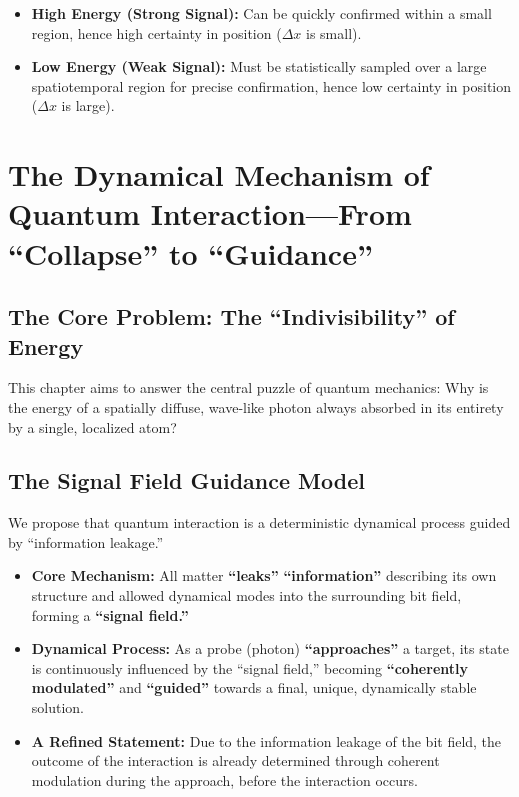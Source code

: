 \documentclass[11pt, a4paper]{article}
\begin{document}
\begin{itemize}
    \item \textbf{High Energy (Strong Signal):} Can be quickly confirmed within a small region, hence high certainty in position ($\Delta x$ is small).
    \item \textbf{Low Energy (Weak Signal):} Must be statistically sampled over a large spatiotemporal region for precise confirmation, hence low certainty in position ($\Delta x$ is large).
\end{itemize}

\section{The Dynamical Mechanism of Quantum Interaction---From ``Collapse'' to ``Guidance''}

\subsection{The Core Problem: The ``Indivisibility'' of Energy}

This chapter aims to answer the central puzzle of quantum mechanics: Why is the energy of a spatially diffuse, wave-like photon always absorbed in its entirety by a single, localized atom?

\subsection{The Signal Field Guidance Model}

We propose that quantum interaction is a deterministic dynamical process guided by ``information leakage.''

\begin{itemize}
    \item \textbf{Core Mechanism:} All matter \textbf{``leaks''} \textbf{``information''} describing its own structure and allowed dynamical modes into the surrounding bit field, forming a \textbf{``signal field.''}
    \item \textbf{Dynamical Process:} As a probe (photon) \textbf{``approaches''} a target, its state is continuously influenced by the ``signal field,'' becoming \textbf{``coherently modulated''} and \textbf{``guided''} towards a final, unique, dynamically stable solution.
    \item \textbf{A Refined Statement:} Due to the information leakage of the bit field, the outcome of the interaction is already determined through coherent modulation during the approach, before the interaction occurs.
\end{itemize}
\end{document}
